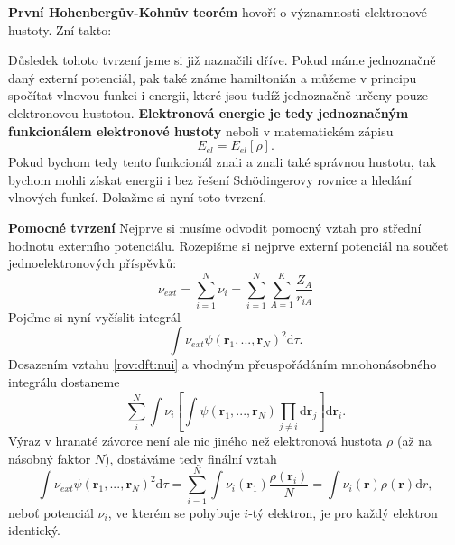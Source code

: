 \textbf{První Hohenbergův-Kohnův teorém} hovoří o významnosti elektronové hustoty. Zní takto:

\bigskip
\noindent {}

\bigskip
Důsledek tohoto tvrzení jsme si již naznačili dříve. Pokud máme jednoznačně daný externí potenciál, pak také známe hamiltonián a můžeme v principu spočítat vlnovou funkci i energii, které jsou tudíž jednoznačně určeny pouze elektronovou hustotou. \textbf{Elektronová energie je tedy jednoznačným funkcionálem elektronové hustoty} neboli v matematickém zápisu
\begin{equation}
E_{el}=E_{el}[\rho] .
\end{equation}
Pokud bychom tedy tento funkcionál znali a znali také správnou hustotu, tak bychom mohli získat energii i bez řešení Sch\"{o}dingerovy rovnice a hledání vlnových funkcí.
Dokažme si nyní toto tvrzení. 

\textbf{Pomocné tvrzení} Nejprve si musíme odvodit pomocný vztah pro střední hodnotu externího potenciálu.
Rozepišme si nejprve externí potenciál na součet jednoelektronových příspěvků:
\begin{equation}
\nu_{ext}=\sum_{i=1}^N \nu_i = \sum_{i=1}^N \sum_{A=1}^K \frac{Z_A}{r_{iA}}  
\label{rov:dft:nui}
\end{equation}
Pojďme si nyní vyčíslit integrál
\begin{equation}
\int \nu_{ext} \psi(\textbf{r}_1,...,\textbf{r}_N)^2\mathrm{d}\tau .
\end{equation}
Dosazením vztahu \eqref{rov:dft:nui} a vhodným přeuspořádáním mnohonásobného integrálu dostaneme
\begin{equation}
\sum_i^N \int \nu_i \left[\int \psi(\mathbf{r}_1,...,\mathbf{r}_N)\prod_{j\neq i}\mathrm{d}\textbf{r}_j\right] \mathrm{d}\textbf{r}_i .
\end{equation}
Výraz v hranaté závorce není ale nic jiného než elektronová hustota $\rho$ (až na násobný faktor $N$), dostáváme tedy finální vztah
\begin{equation}
\int \nu_{ext} \psi(\textbf{r}_1,...,\textbf{r}_N)^2\mathrm{d}\tau = \sum_{i=1}^N \int \nu_i(\textbf{r}_1)\frac{\rho(\textbf{r}_i)}{N}= \int \nu_i(\textbf{r})\rho(\textbf{r}) \mathrm{d}r ,
\label{rov:dft:intnupsi}
\end{equation}
neboť potenciál $\nu_i$, ve kterém se pohybuje $i$-tý elektron, je pro každý elektron identický.

